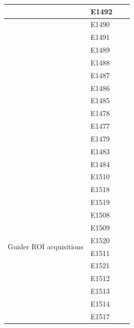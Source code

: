 \begin{longtable}{|p{2cm}|p{2cm}|p{2cm}|p{10cm}|}
& E1492 & & \\ \hline
& E1490 & & \\ \hline
& E1491 & & \\ \hline
& E1489 & & \\ \hline
& E1488 & & \\ \hline
& E1487 & & \\ \hline
& E1486 & & \\ \hline
& E1485 & & \\ \hline
& E1478 & & \\ \hline
& E1477 & & \\ \hline
& E1479 & & \\ \hline
& E1483 & & \\ \hline
& E1484 & & \\ \hline
\multirow{12}{=}{Guider ROI acquisitions} & E1510 & & \\ 
& E1518 & & \\ \hline
& E1519 & & \\ \hline
& E1508 & & \\ \hline
& E1509 & & \\ \hline
& E1520 & & \\ \hline
& E1511 & & \\ \hline
& E1521 & & \\ \hline
& E1512 & & \\ \hline
& E1513 & & \\ \hline
& E1514 & & \\ \hline
& E1517 & & \\ \hline
\end{longtable}

